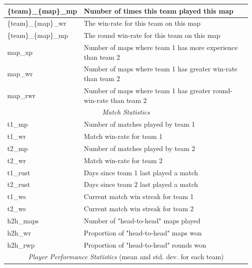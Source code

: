 \begin{table}[h]
\begin{tabular}{|l|l|}
		\{team\}\_\{map\}\_mp & Number of times this team played this map         		  			   \\ \hline
		\{team\}\_\{map\}\_wr & The win-rate for this team on this map          		 			   \\ \hline
		\{team\}\_\{map\}\_mp & The round win-rate for this team on this map			  			   \\ \hline
		map\_xp  			  & Number of maps where team 1 has more experience than team 2 		   \\ \hline
		map\_wr  			  & Number of maps where team 1 has greater win-rate than team 2		   \\ \hline
		map\_rwr 			  & Number of maps where team 1 has greater round-win-rate than team 2	   \\ \hline
	\multicolumn{2}{|c|}{\rule{0pt}{2.6ex}\textit{Match Statistics}} 								   \\ \hline
		t1\_mp                & Number of matches played by team 1                		  			   \\ \hline
		t1\_wr                & Match win-rate for team 1         						  			   \\ \hline
		t2\_mp                & Number of matches played by team 2						  			   \\ \hline
		t2\_wr                & Match win-rate for team 2         						  			   \\ \hline
		t1\_rust              & Days since team 1 last played a match                                  \\ \hline
		t2\_rust              & Days since team 2 last played a match                                  \\ \hline
		t1\_ws                & Current match win streak for team 1                                    \\ \hline
		t2\_ws                & Current match win streak for team 2                                    \\ \hline
		h2h\_maps             & Number of "head-to-head" maps played                                   \\ \hline
		h2h\_wr               & Proportion of "head-to-head" maps won 			                       \\ \hline
		h2h\_rwp              & Proportion of "head-to-head" rounds won 		                       \\ \hline
	\multicolumn{2}{|c|}{\rule{0pt}{2.6ex}\textit{Player Performance Statistics} (mean and std. dev. for each team)} \\ \hline

\end{tabular}
\end{table}
